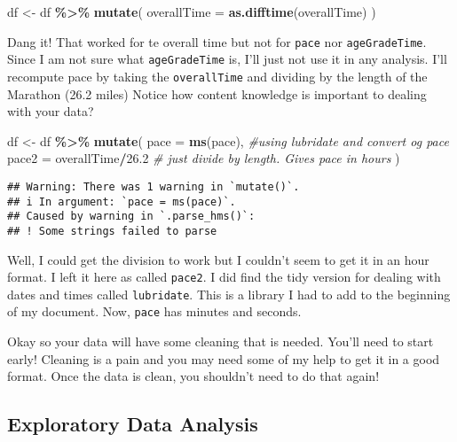 \documentclass[
]{article}
\newenvironment{Shaded}{\begin{snugshade}}{\end{snugshade}}
\newcommand{\AttributeTok}[1]{\textcolor[rgb]{0.13,0.29,0.53}{#1}}
\newcommand{\CommentTok}[1]{\textcolor[rgb]{0.56,0.35,0.01}{\textit{#1}}}
\newcommand{\FloatTok}[1]{\textcolor[rgb]{0.00,0.00,0.81}{#1}}
\newcommand{\FunctionTok}[1]{\textcolor[rgb]{0.13,0.29,0.53}{\textbf{#1}}}
\newcommand{\NormalTok}[1]{#1}
\newcommand{\OtherTok}[1]{\textcolor[rgb]{0.56,0.35,0.01}{#1}}
\newcommand{\SpecialCharTok}[1]{\textcolor[rgb]{0.81,0.36,0.00}{\textbf{#1}}}
\begin{document}
\begin{Shaded}
\begin{Highlighting}[]
\NormalTok{df }\OtherTok{\textless{}{-}}\NormalTok{ df }\SpecialCharTok{\%\textgreater{}\%} \FunctionTok{mutate}\NormalTok{(}
  \AttributeTok{overallTime =} \FunctionTok{as.difftime}\NormalTok{(overallTime)}
\NormalTok{)}
\end{Highlighting}
\end{Shaded}

Dang it! That worked for te overall time but not for \texttt{pace} nor
\texttt{ageGradeTime}. Since I am not sure what \texttt{ageGradeTime}
is, I'll just not use it in any analysis. I'll recompute pace by taking
the \texttt{overallTime} and dividing by the length of the Marathon
(26.2 miles) Notice how content knowledge is important to dealing with
your data?

\begin{Shaded}
\begin{Highlighting}[]
\NormalTok{df }\OtherTok{\textless{}{-}}\NormalTok{ df }\SpecialCharTok{\%\textgreater{}\%} \FunctionTok{mutate}\NormalTok{(}
  \AttributeTok{pace =} \FunctionTok{ms}\NormalTok{(pace), }\CommentTok{\#using lubridate and convert og pace}
  \AttributeTok{pace2 =}\NormalTok{ overallTime}\SpecialCharTok{/}\FloatTok{26.2} \CommentTok{\# just divide by length.  Gives pace in hours}
\NormalTok{)}
\end{Highlighting}
\end{Shaded}

\begin{verbatim}
## Warning: There was 1 warning in `mutate()`.
## i In argument: `pace = ms(pace)`.
## Caused by warning in `.parse_hms()`:
## ! Some strings failed to parse
\end{verbatim}

Well, I could get the division to work but I couldn't seem to get it in
an hour format. I left it here as called \texttt{pace2}. I did find the
tidy version for dealing with dates and times called \texttt{lubridate}.
This is a library I had to add to the beginning of my document. Now,
\texttt{pace} has minutes and seconds.

Okay so your data will have some cleaning that is needed. You'll need to
start early! Cleaning is a pain and you may need some of my help to get
it in a good format. Once the data is clean, you shouldn't need to do
that again!

\subsection{Exploratory Data Analysis}\label{exploratory-data-analysis}
\end{document}

